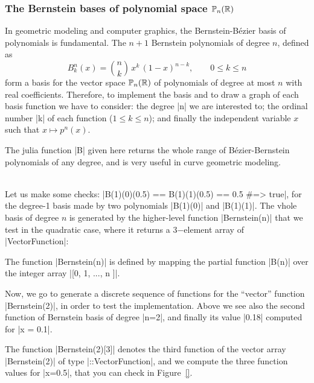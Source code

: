 \subsubsection*{The Bernstein bases of polynomial space $\mathbb{P}_n(\mathbb{R})$}

In geometric modeling and computer graphics, the Bernstein-Bézier basis of polynomials is fundamental. The $n+1$ Bernstein polynomials of degree $n$, defined as
\[
B^n_k(x) = {n \choose k}\,x^k\,(1-x)^{n-k}, \qquad 0\leq k \leq n
\]
form a basis for the vector space $\mathbb{P}_{n}(\mathbb{R})$ of polynomials of degree at most $n$ with real coefficients. Therefore, to implement the basis and to draw a graph of each basis function we have to consider: the degree |n| we are interested to; the ordinal number |k| of each function ($1\leq k\leq n$); and finally the independent variable $x$ such that $x \mapsto p^n(x)$. 

\begin{script}
The julia function |B| given here returns the whole range of Bézier-Bernstein polynomials of any degree, and is very useful in curve geometric modeling.

\end{script}\\[3mm]


Let us make some checks: |B(1)(0)(0.5) == B(1)(1)(0.5) == 0.5 #=> true|,  for the degree-1 basis  made by two polynomials |B(1)(0)| and |B(1)(1)|.  The vhole basis of degree $n$ is generated by the higher-level function |Bernstein(n)| that we test in the quadratic case, where it returns a 3−element array of |Vector{Function}|:
\begin{coding}
The function |Bernstein(n)| is defined by mapping the partial function |B(n)| over the integer array |[0, 1, ..., n ]|. 

\end{coding}


Now, we go to generate a discrete sequence of functions for the “vector” function |Bernstein(2)|, in order to test the implementation. 
Above we see also the second function of Bernstein basis of degree |n=2|, and finally its value |0.18| computed for |x = 0.1|. 

\begin{coding} The function |Bernstein(2)[3]| denotes the third  function of the vector array |Bernstein(2)| of type |::Vector{Function}|, and we compute the three function values for |x=0.5|, that you can check in Figure~\ref{}.


\end{coding}



